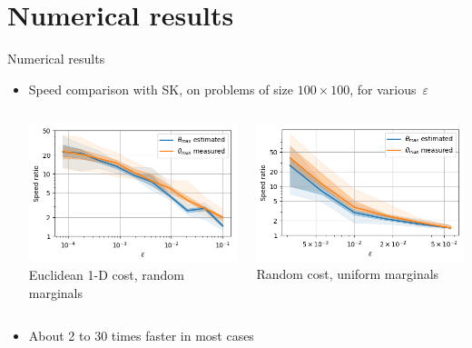 \documentclass[compress]{beamer}
\renewcommand{\epsilon}{\varepsilon}
\begin{document}
\section{Numerical results}
\begin{frame}{Numerical results}
	\begin{itemize}
	\item Speed comparison with SK, on problems of size $100 \times 100$, for various~$\epsilon$\\
	\begin{columns}
		\begin{column}{0.5\textwidth}
			\centering
			\includegraphics[width=\textwidth]{images/speedratio_image}\\
			\footnotesize Euclidean 1-D cost, random marginals
		\end{column}
		\begin{column}{0.5\textwidth}
			\centering
			\includegraphics[width=\textwidth]{images/speedratio_ML}\\
			\footnotesize  Random cost, uniform marginals
		\end{column}
	\end{columns}
	\vspace{0.2cm}
	\item About 2 to 30 times faster in most cases
	\end{itemize}
\end{frame}
\end{document}
